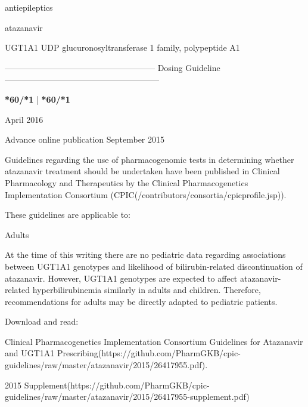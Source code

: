 \documentclass{resume} %
\begin{document}
\begin{rSection}{ antiepileptics }
\end{rSection}\begin{rSection}{ atazanavir }
\item[]
\begin{rSubsection}{ UGT1A1 }{ UDP glucuronosyltransferase 1 family, polypeptide A1 }{}{}
\item[]
\item[] ------------------------------------------------------ Dosing Guideline --------------------------------------------------------\newline
\item[]
\item[] \textbf{ *60/*1 } | \textbf{ *60/*1 }
\item April 2016
 \newline
\item Advance online publication September 2015
 \newline
\item Guidelines regarding the use of pharmacogenomic tests in determining whether atazanavir treatment should be undertaken have been published in Clinical Pharmacology and Therapeutics by the Clinical Pharmacogenetics Implementation Consortium (CPIC(/contributors/consortia/cpicprofile.jsp)).
 \newline
\item These guidelines are applicable to:
 \newline
\item Adults
 \newline
\item At the time of this writing there are no pediatric data regarding associations between UGT1A1 genotypes and likelihood of bilirubin-related discontinuation of atazanavir. However, UGT1A1 genotypes are expected to affect atazanavir-related hyperbilirubinemia similarly in adults and children. Therefore, recommendations for adults may be directly adapted to pediatric patients.
 \newline
\item Download and read:
 \newline
\item Clinical Pharmacogenetics Implementation Consortium Guidelines for Atazanavir and UGT1A1 Prescribing(https://github.com/PharmGKB/cpic-guidelines/raw/master/atazanavir/2015/26417955.pdf).
 \newline
\item 2015 Supplement(https://github.com/PharmGKB/cpic-guidelines/raw/master/atazanavir/2015/26417955-supplement.pdf)

\end{rSubsection}
\end{rSection}
\end{document}

